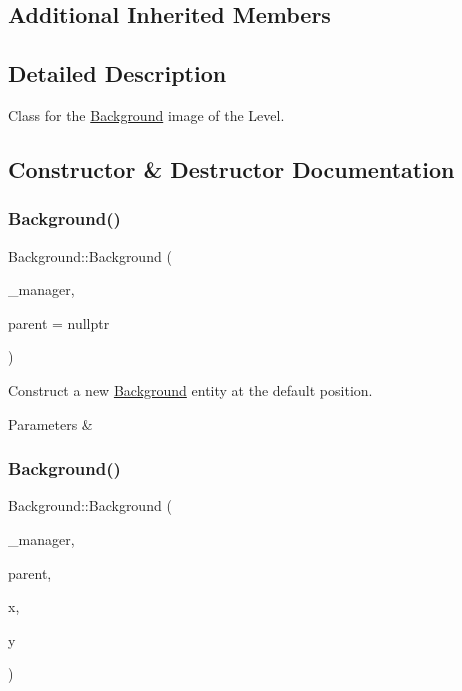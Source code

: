 \subsection*{Additional Inherited Members}


\subsection{Detailed Description}
Class for the \mbox{\hyperlink{class_background}{Background}} image of the Level. 

\subsection{Constructor \& Destructor Documentation}
\mbox{\label{class_background_a675fdd2d1e1ebbe036e4d7d96ec4ff53}} 
\subsubsection{\texorpdfstring{Background()}{Background()}\hspace{0.1cm}{\footnotesize\ttfamily [1/3]}}
{\footnotesize\ttfamily Background\+::\+Background (\begin{DoxyParamCaption}\item[{\mbox{\hyperlink{class_game_manager}{Game\+Manager}} $\ast$}]{\+\_\+manager,  }\item[{\mbox{\hyperlink{class_game_entity}{Game\+Entity}} $\ast$}]{parent = {\ttfamily nullptr} }\end{DoxyParamCaption})}



Construct a new \mbox{\hyperlink{class_background}{Background}} entity at the default position. 


\begin{DoxyParams}{Parameters}
{\em } & \\
\hline
\end{DoxyParams}
\mbox{\label{class_background_ae64742f05c5b2f6a5f69c0f1bba613ab}} 
\subsubsection{\texorpdfstring{Background()}{Background()}\hspace{0.1cm}{\footnotesize\ttfamily [2/3]}}
{\footnotesize\ttfamily Background\+::\+Background (\begin{DoxyParamCaption}\item[{\mbox{\hyperlink{class_game_manager}{Game\+Manager}} $\ast$}]{\+\_\+manager,  }\item[{\mbox{\hyperlink{class_game_entity}{Game\+Entity}} $\ast$}]{parent,  }\item[{float}]{x,  }\item[{float}]{y }\end{DoxyParamCaption})}



